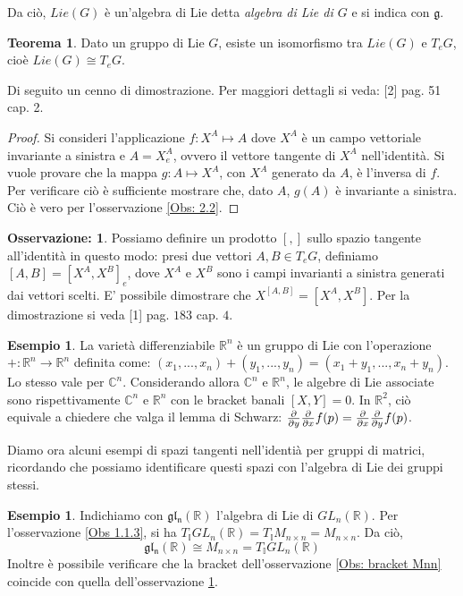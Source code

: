\documentclass[12pt,a4paper]{report}
\theoremstyle{definition}
\theoremstyle{Theorem}
\newtheorem{Theo}[Def]{Teorema}
\theoremstyle{definition}
\newtheorem{Ex}[Def]{Esempio}
\theoremstyle{definition}
\theoremstyle{definition}
\newtheorem{Obs}[Def]{Osservazione:}
\begin{document}
Da ciò, $Lie(G)$ è un'algebra di Lie detta \textit{algebra di Lie di $G$} e si indica con $\mathfrak{g}$.
\begin{Theo}
	Dato un gruppo di Lie $G$, esiste un isomorfismo tra $Lie(G)$ e $T_eG$, cioè $Lie(G)\cong T_eG$.
\end{Theo}
Di seguito un cenno di dimostrazione. Per maggiori dettagli si veda: [2] pag. 51 cap. 2.
\begin{proof}
	Si consideri l'applicazione $f:X^A\mapsto A$ dove $X^A$ è un campo vettoriale invariante a sinistra e $A=X^A_e$, ovvero il vettore tangente di $X^A$ nell'identità.
	Si vuole provare che la mappa $g:A\mapsto X^A$, con $X^A$ generato da $A$, è l'inversa di $f$. Per verificare ciò è sufficiente mostrare che, dato $A$, $g(A)$ è invariante a sinistra. Ciò è vero per l'osservazione \ref{Obs: 2.2}.
\end{proof}
\begin{Obs}\label{Obs: bracket T}
	Possiamo definire un prodotto $[,]$ sullo spazio tangente all'identità in questo modo: presi due vettori $A,B\in T_eG$, definiamo $[A,B]=[X^A,X^B]_e$, dove $X^A$ e $X^B$ sono i campi invarianti a sinistra generati dai vettori scelti. E' possibile dimostrare che $X^{[A,B]}=[X^A,X^B]$. Per la dimostrazione si veda [1] pag. $183$ cap. $4$.
\end{Obs}
\begin{Ex}
	La varietà differenziabile $\mathbb{R}^n$ è un gruppo di Lie con l'operazione\\ $+:\mathbb{R}^n\rightarrow\mathbb{R}^n$ definita come: $(x_1,...,x_n)+(y_1,...,y_n)=(x_1+y_1,...,x_n+y_n)$. Lo stesso vale per $\mathbb{C}^n$.
	Considerando allora $\mathbb{C}^n$ e $\mathbb{R}^n$, le algebre di Lie associate sono rispettivamente $\mathbb{C}^n$ e $\mathbb{R}^n$ con le bracket banali $[X,Y]=0$. In $\mathbb{R}^2$, ciò equivale a chiedere che valga il lemma di Schwarz: ${\partial\over\partial y}{\partial\over\partial x}f(p)={\partial\over\partial x}{\partial\over\partial y}f(p)$.
\end{Ex}
Diamo ora alcuni esempi di spazi tangenti nell'identià per gruppi di matrici, ricordando che possiamo identificare questi spazi con l'algebra di Lie dei gruppi stessi.
\begin{Ex}
	Indichiamo con $\mathfrak{gl_n(\mathbb{R})}$ l'algebra di Lie di $GL_n(\mathbb{R})$.
	Per l'osservazione \ref{Obs 1.1.3}, si ha $T_\mathbb{I}GL_n(\mathbb{R})=T_\mathbb{I}M_{n\times n}=M_{n\times n}$. Da ciò, $$\mathfrak{gl_n(\mathbb{R})}\cong M_{n\times n}= T_\mathbb{I}GL_n(\mathbb{R})$$
	Inoltre è possibile verificare che la bracket dell'osservazione \ref{Obs: bracket Mnn} coincide con quella dell'osservazione \ref{Obs: bracket T}.
\end{Ex}
\end{document}
